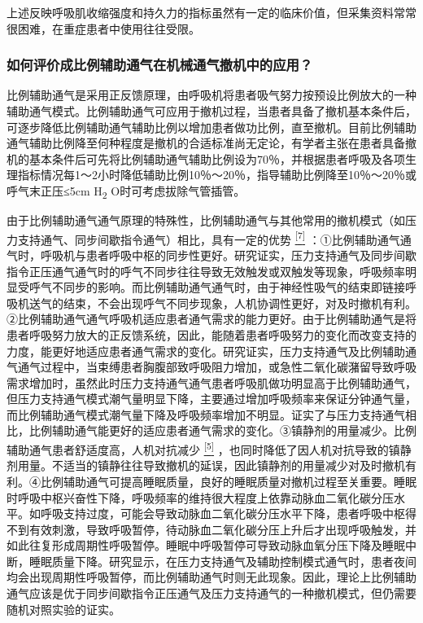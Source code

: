 上述反映呼吸肌收缩强度和持久力的指标虽然有一定的临床价值，但采集资料常常很困难，在重症患者中使用往往受限。

\subsubsection{如何评价成比例辅助通气在机械通气撤机中的应用？}

比例辅助通气是采用正反馈原理，由呼吸机将患者吸气努力按预设比例放大的一种辅助通气模式。比例辅助通气可应用于撤机过程，当患者具备了撤机基本条件后，可逐步降低比例辅助通气辅助比例以增加患者做功比例，直至撤机。目前比例辅助通气辅助比例降至何种程度是撤机的合适标准尚无定论，有学者主张在患者具备撤机的基本条件后可先将比例辅助通气辅助比例设为70％，并根据患者呼吸及各项生理指标情况每1～2小时降低辅助比例10％～20％，指导辅助比例降至10％～20％或呼气末正压≤5cm
H\textsubscript{2} O时可考虑拔除气管插管。

由于比例辅助通气通气原理的特殊性，比例辅助通气与其他常用的撤机模式（如压力支持通气、同步间歇指令通气）相比，具有一定的优势
\protect\hyperlink{text00016.htmlux5cux23ch7-15}{\textsuperscript{{[}7{]}}}
：①比例辅助通气通气时，呼吸机与患者呼吸中枢的同步性更好。研究证实，压力支持通气及同步间歇指令正压通气通气时的呼气不同步往往导致无效触发或双触发等现象，呼吸频率明显受呼气不同步的影响。而比例辅助通气通气时，由于神经性吸气的结束即链接呼吸机送气的结束，不会出现呼气不同步现象，人机协调性更好，对及时撤机有利。②比例辅助通气通气呼吸机适应患者通气需求的能力更好。由于比例辅助通气是将患者呼吸努力放大的正反馈系统，因此，能随着患者呼吸努力的变化而改变支持的力度，能更好地适应患者通气需求的变化。研究证实，压力支持通气及比例辅助通气通气过程中，当束缚患者胸腹部致呼吸阻力增加，或急性二氧化碳潴留导致呼吸需求增加时，虽然此时压力支持通气通气患者呼吸肌做功明显高于比例辅助通气，但压力支持通气模式潮气量明显下降，主要通过增加呼吸频率来保证分钟通气量，而比例辅助通气模式潮气量下降及呼吸频率增加不明显。证实了与压力支持通气相比，比例辅助通气能更好的适应患者通气需求的变化。③镇静剂的用量减少。比例辅助通气患者舒适度高，人机对抗减少
\protect\hyperlink{text00016.htmlux5cux23ch5-15}{\textsuperscript{{[}5{]}}}
，也同时降低了因人机对抗导致的镇静剂用量。不适当的镇静往往导致撤机的延误，因此镇静剂的用量减少对及时撤机有利。④比例辅助通气可提高睡眠质量，良好的睡眠质量对撤机过程至关重要。睡眠时呼吸中枢兴奋性下降，呼吸频率的维持很大程度上依靠动脉血二氧化碳分压水平。如呼吸支持过度，可能会导致动脉血二氧化碳分压水平下降，患者呼吸中枢得不到有效刺激，导致呼吸暂停，待动脉血二氧化碳分压上升后才出现呼吸触发，并如此往复形成周期性呼吸暂停。睡眠中呼吸暂停可导致动脉血氧分压下降及睡眠中断，睡眠质量下降。研究显示，在压力支持通气及辅助控制模式通气时，患者夜间均会出现周期性呼吸暂停，而比例辅助通气时则无此现象。因此，理论上比例辅助通气应该是优于同步间歇指令正压通气及压力支持通气的一种撤机模式，但仍需要随机对照实验的证实。

